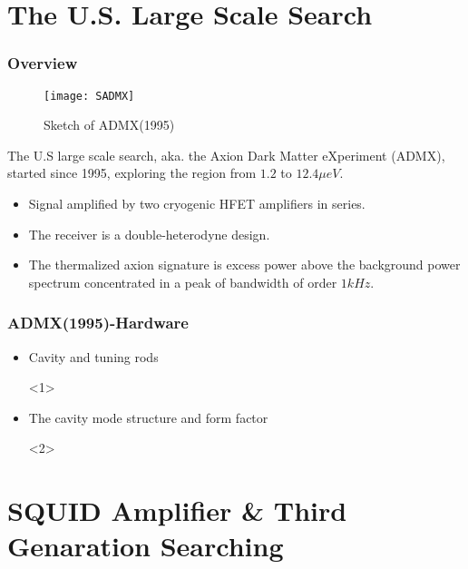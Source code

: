 \documentclass{beamer}
\begin{document}
\section{The U.S. Large Scale Search}
\begin{frame}
  \frametitle{Overview}
  \begin{wrapfigure}{l}{0.33\textwidth}
    \caption{Sketch of ADMX(1995)}
    \centering
    \texttt{[image: SADMX]}
  \end{wrapfigure}
  The U.S large scale search, aka. the Axion Dark Matter eXperiment (ADMX),
  started since 1995, exploring the region from $1.2$ to $12.4\mu eV$.
  \begin{itemize}
  \item Signal amplified by two cryogenic HFET amplifiers in series.
  \item The receiver is a double-heterodyne design.
  \item The thermalized axion signature is excess power above the background
  power spectrum concentrated in a peak of bandwidth of order $1kHz$.
  \end{itemize}
\end{frame}
\begin{frame}
  \frametitle{ADMX(1995)-Hardware}
  \begin{itemize}
  \item Cavity and tuning rods
    \begin{onlyenv}<1>
    
    \end{onlyenv}
  \item The cavity mode structure and form factor
    \begin{onlyenv}<2>
    
    \end{onlyenv}
  \end{itemize}
\end{frame}

\section{SQUID Amplifier \& Third Genaration Searching}

\end{document}
